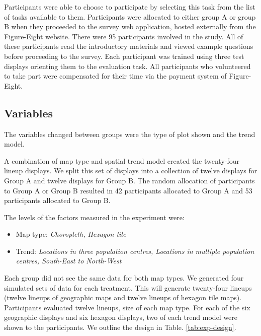 \documentclass[conference,final,]{IEEEtran}
\providecommand{\tightlist}{%
  \setlength{\itemsep}{0pt}\setlength{\parskip}{0pt}}
\begin{document}
Participants were able to choose to participate by selecting this task from the list of tasks available to them.
Participants were allocated to either group A or group B when they proceeded to the survey web application, hosted externally from the Figure-Eight website.
There were 95 participants involved in the study. All of these participants read the introductory materials and viewed example questions before proceeding to the survey. Each participant was trained using three test displays orienting them to the evaluation task.
All participants who volunteered to take part were compensated for their time via the payment system of Figure-Eight.

\hypertarget{variables}{%
\subsection{Variables}\label{variables}}

The variables changed between groups were the type of plot shown and the trend model.

A combination of map type and spatial trend model created the twenty-four lineup displays. We split this set of displays into a collection of twelve displays for Group A and twelve displays for Group B.
The random allocation of participants to Group A or Group B resulted in 42 participants allocated to Group A and 53 participants allocated to Group B.

The levels of the factors measured in the experiment were:

\begin{itemize}
\tightlist
\item
  Map type: \emph{Choropleth, Hexagon tile}
\item
  Trend: \emph{Locations in three population centres, Locations in multiple population centres, South-East to North-West}
\end{itemize}

Each group did not see the same data for both map types. We generated four simulated sets of data for each treatment.
This will generate twenty-four lineups (twelve lineups of geographic maps and twelve lineups of hexagon tile maps). Participants evaluated twelve lineups, size of each map type.
For each of the six geographic displays and six hexagon displays, two of each trend model were shown to the participants. We outline the design in Table. \ref{tab:exp-design}.
\end{document}
